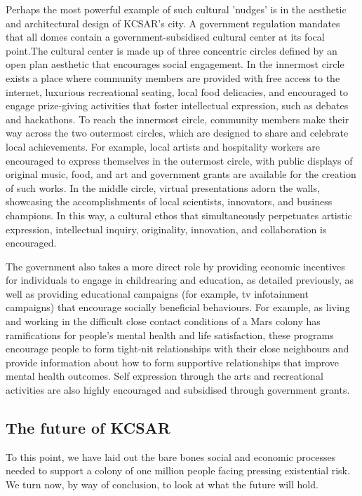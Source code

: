 \documentclass[fleqn,10pt]{Stylesheet} %
\begin{document}
Perhaps the most powerful example of such cultural 'nudges' is in the aesthetic and architectural design of KCSAR's city. A government regulation mandates that all domes contain a government-subsidised cultural center at its focal point.The cultural center is made up of three concentric circles defined by an open plan aesthetic that encourages social engagement. In the innermost circle exists a place where community members are provided with free access to the internet, luxurious recreational seating, local food delicacies, and encouraged to engage prize-giving activities that foster intellectual expression, such as debates and hackathons. To reach the innermost circle, community members make their way across the two outermost circles, which are designed to share and celebrate local achievements. For example, local artists and hospitality workers are encouraged to express themselves in the outermost circle, with public displays of original music, food, and art and government grants are available for the creation of such works. In the middle circle, virtual presentations adorn the walls, showcasing the accomplishments of local scientists, innovators, and business champions. In this way, a cultural ethos that simultaneously perpetuates artistic expression, intellectual inquiry, originality, innovation, and collaboration is encouraged. 

The government also takes a more direct role by providing economic incentives for individuals to engage in childrearing and education, as detailed previously, as well as providing educational campaigns (for example, tv infotainment campaigns) that encourage socially beneficial behaviours. For example, as living and working in the difficult close contact conditions of a Mars colony has ramifications for people's mental health and life satisfaction, these programs encourage people to form tight-nit relationships with their close neighbours and provide information about how to form supportive relationships that improve mental health outcomes. Self expression through the arts and recreational activities are also highly encouraged and subsidised through government grants.

\subsection{The future of KCSAR}
To this point, we have laid out the bare bones social and economic processes needed to support a colony of one million people facing pressing existential risk. We turn now, by way of conclusion, to look at what the future will hold. 
\end{document}
